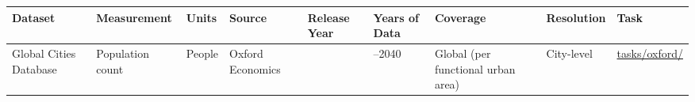 \documentclass[
  letterpaper,
  DIV=11,
  numbers=noendperiod]{scrreprt}
\newcounter{none} %
\begin{document}
{\def\LTcaptype{none} %
\begin{longtable}[]{@{}
  >{\raggedright\arraybackslash}p{}
  >{\raggedright\arraybackslash}p{}
  >{\raggedright\arraybackslash}p{}
  >{\raggedright\arraybackslash}p{}
  >{\raggedright\arraybackslash}p{}
  >{\raggedright\arraybackslash}p{}
  >{\raggedright\arraybackslash}p{}
  >{\raggedright\arraybackslash}p{}
  >{\raggedright\arraybackslash}p{}@{}}
\toprule\noalign{}
\begin{minipage}[b]{\linewidth}\raggedright
Dataset
\end{minipage} & \begin{minipage}[b]{\linewidth}\raggedright
Measurement
\end{minipage} & \begin{minipage}[b]{\linewidth}\raggedright
Units
\end{minipage} & \begin{minipage}[b]{\linewidth}\raggedright
Source
\end{minipage} & \begin{minipage}[b]{\linewidth}\raggedright
Release Year
\end{minipage} & \begin{minipage}[b]{\linewidth}\raggedright
Years of Data
\end{minipage} & \begin{minipage}[b]{\linewidth}\raggedright
Coverage
\end{minipage} & \begin{minipage}[b]{\linewidth}\raggedright
Resolution
\end{minipage} & \begin{minipage}[b]{\linewidth}\raggedright
Task
\end{minipage} \\
\midrule\noalign{}
\endhead
\bottomrule\noalign{}
\endlastfoot
Global Cities Database & Population count & People & Oxford Economics &
2022 & 2000--2040 & Global (per functional urban area) & City-level &
\href{../tasks/oxford/}{tasks/oxford/} \\
\end{longtable}
}
\end{document}
